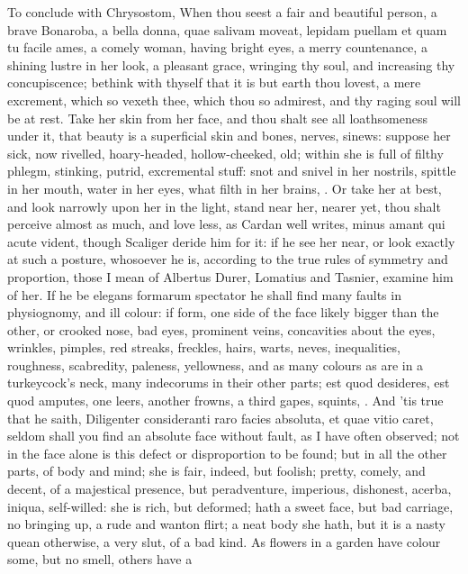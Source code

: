 {To conclude with Chrysostom, When thou seest a fair and beautiful
person, a brave Bonaroba, a bella donna, quae salivam moveat, lepidam
puellam et quam tu facile ames, a comely woman, having bright eyes, a
merry countenance, a shining lustre in her look, a pleasant grace,
wringing thy soul, and increasing thy concupiscence; bethink with
thyself that it is but earth thou lovest, a mere excrement, which so
vexeth thee, which thou so admirest, and thy raging soul will be at
rest. Take her skin from her face, and thou shalt see all loathsomeness
under it, that beauty is a superficial skin and bones, nerves, sinews:
suppose her sick, now rivelled, hoary-headed, hollow-cheeked, old;
within she is full of filthy phlegm, stinking, putrid, excremental
stuff: snot and snivel in her nostrils, spittle in her mouth, water in
her eyes, what filth in her brains, \etc{}. Or take her at best, and look
narrowly upon her in the light, stand near her, nearer yet, thou shalt
perceive almost as much, and love less, as  Cardan well writes,
minus amant qui acute vident, though Scaliger deride him for it: if he
see her near, or look exactly at such a posture, whosoever he is,
according to the true rules of symmetry and proportion, those I mean of
Albertus Durer, Lomatius and Tasnier, examine him of her. If he be
elegans formarum spectator he shall find many faults in physiognomy,
and ill colour: if form, one side of the face likely bigger than the
other, or crooked nose, bad eyes, prominent veins, concavities about
the eyes, wrinkles, pimples, red streaks, freckles, hairs, warts,
neves, inequalities, roughness, scabredity, paleness, yellowness, and
as many colours as are in a turkeycock's neck, many indecorums in their
other parts; est quod desideres, est quod amputes, one leers, another
frowns, a third gapes, squints, \etc{}. And 'tis true that he saith,
Diligenter consideranti raro facies absoluta, et quae vitio
caret, seldom shall you find an absolute face without fault, as I have
often observed; not in the face alone is this defect or disproportion
to be found; but in all the other parts, of body and mind; she is fair,
indeed, but foolish; pretty, comely, and decent, of a majestical
presence, but peradventure, imperious, dishonest, acerba, iniqua,
self-willed: she is rich, but deformed; hath a sweet face, but bad
carriage, no bringing up, a rude and wanton flirt; a neat body she
hath, but it is a nasty quean otherwise, a very slut, of a bad kind. As
flowers in a garden have colour some, but no smell, others have a
}
